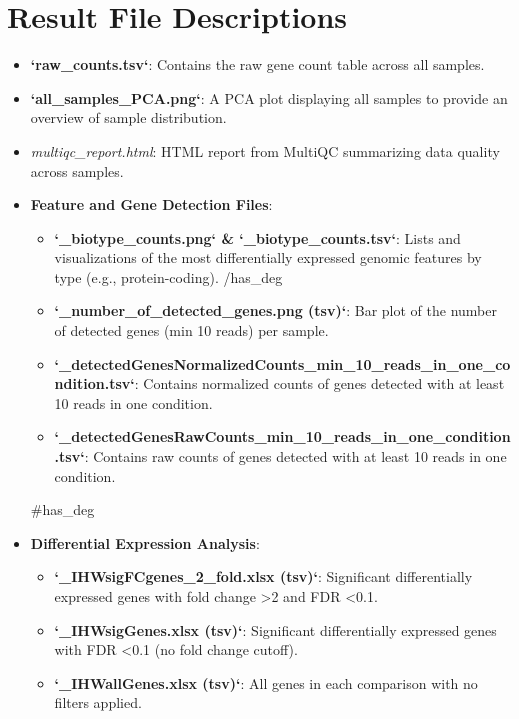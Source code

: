 \documentclass{article}
\begin{document}
\section*{Result File Descriptions}
\begin{itemize}
    \item \textbf{`raw\_counts.tsv`}: Contains the raw gene count table across all samples.
    \item \textbf{`all\_samples\_PCA.png`}: A PCA plot displaying all samples to provide an overview of sample distribution.
    \item \textit{multiqc\_report.html}: HTML report from MultiQC summarizing data quality across samples.
    \item \textbf{Feature and Gene Detection Files}:
    \begin{itemize}
        {{#has_deg}}
        \item \textbf{`\textasteriskcentered{}\_biotype\_counts.png` \& `\_biotype\_counts.tsv`}: Lists and visualizations of the most differentially expressed genomic features by type (e.g., protein-coding).
        {{/has_deg}}
        \item \textbf{`\textasteriskcentered{}\_number\_of\_detected\_genes.png (tsv)`}: Bar plot of the number of detected genes (min 10 reads) per sample.
        \item \textbf{`\textasteriskcentered{}\_detectedGenesNormalizedCounts\_min\_10\_reads\_in\_one\_condition.tsv`}: Contains normalized counts of genes detected with at least 10 reads in one condition.
        \item \textbf{`\textasteriskcentered{}\_detectedGenesRawCounts\_min\_10\_reads\_in\_one\_condition.tsv`}: Contains raw counts of genes detected with at least 10 reads in one condition.
    \end{itemize}
    {{#has_deg}}
    \item \textbf{Differential Expression Analysis}:
    \begin{itemize}
        \item \textbf{`\textasteriskcentered{}\_IHWsigFCgenes\_2\_fold.xlsx (tsv)`}: Significant differentially expressed genes with fold change \textgreater 2 and FDR \textless 0.1.
        \item \textbf{`\textasteriskcentered{}\_IHWsigGenes.xlsx (tsv)`}: Significant differentially expressed genes with FDR \textless 0.1 (no fold change cutoff).
        \item \textbf{`\textasteriskcentered{}\_IHWallGenes.xlsx (tsv)`}: All genes in each comparison with no filters applied.

\end{itemize}
\end{itemize}
\end{document}

